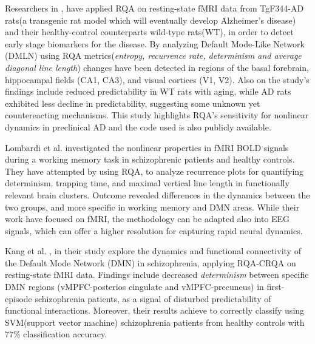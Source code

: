 \documentclass{article}
\begin{document}

			Researchers in \cite{rezaei},
			have applied RQA on resting-state fMRI data from 
			TgF344-AD rats(a transgenic rat model which will eventually develop Alzheimer’s disease)
			and their healthy-control counterparts wild-type rats(WT),
			in order to detect early stage biomarkers for the disease.
			By analyzing Default Mode-Like Network (DMLN) 
			using RQA metrics(\textit{entropy, recurrence rate, determinism 
			and average diagonal line length}) 
			changes have been detected in regions of 
			the basal forebrain, hippocampal fields (CA1, CA3), and visual 
			cortices (V1, V2). Also on the study's findings include reduced predictability in 
			WT rats with aging, while AD rats exhibited less decline
			in predictability, suggesting some unknown yet countereacting mechanisms. 
			This study highlights RQA's sensitivity for nonlinear dynamics 
			in preclinical AD and the code used is also publicly available.


			Lombardi et al.\cite{Lombardi2014} investigated the 
			nonlinear properties in fMRI BOLD signals 
			during a working memory task in 
			schizophrenic patients and healthy controls. 
			They have attempted by using RQA, to analyze recurrence plots 
			for quantifying determinism, trapping time, 
			and maximal vertical line length 
			in functionally relevant brain clusters. 
			Outcome revealed differences in 
			the dynamics between the two groups, 
			and more specific in working memory and DMN areas. 
			While their work have focused on fMRI, the methodology can be adapted also into
			EEG signals, which can offer a higher resolution for capturing rapid neural dynamics.

			Kang et al. \cite{kang}, in their study explore the dynamics and functional connectivity of the 
			Default Mode Network (DMN) in schizophrenia, applying RQA-CRQA on resting-state fMRI data. 
			Findings include decreased \textit{determinism} between specific DMN regions 
			(vMPFC-posterios cingulate and vMPFC-precuneus) in first-episode schizophrenia patients, 
			as a signal of disturbed predictability of functional interactions. 
			Moreover, their results achieve to correctly classify using SVM(support vector machine)
			schizophrenia patients from healthy controls with 77\% classification accuracy.
\end{document}

